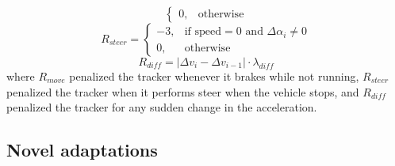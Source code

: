 \documentclass[sigconf]{aamas}
\begin{document}
\begin{itemize}
\begin{equation}
\begin{cases}
  0,  & \text{otherwise} \end{cases}\end{equation}
  \begin{equation}R_{steer} = \begin{cases}
  -3, & \text{if } \text{speed} = 0 \text{ and } \Delta \alpha_i \neq 0 \\
  0,  & \text{otherwise} \end{cases}\end{equation}
  \begin{equation}
  R_{diff} = |\Delta v_i - \Delta v_{i-1}| \cdot \lambda_{diff}
    \end{equation}
    where \(R_{move}\) penalized the tracker whenever it brakes while not running, \(R_{steer}\) penalized the tracker when it performs steer when the vehicle stops, and \(R_{diff}\) penalized the tracker for any sudden change in the acceleration.
\end{itemize}
\subsection{Novel adaptations}
\end{document}
